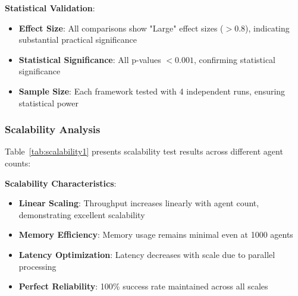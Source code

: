 \documentclass[conference]{IEEEtran}
\begin{document}
\textbf{Statistical Validation}:
\begin{itemize}
\item \textbf{Effect Size}: All comparisons show "Large" effect sizes ($>0.8$), indicating substantial practical significance
\item \textbf{Statistical Significance}: All p-values $<0.001$, confirming statistical significance
\item \textbf{Sample Size}: Each framework tested with 4 independent runs, ensuring statistical power
\end{itemize}

\subsubsection{Scalability Analysis}

Table~\ref{tab:scalability1} presents scalability test results across different agent counts:

\begin{table}[htbp]
\caption{Scalability Test Results}
\label{tab:scalability1}
\centering
{}
\end{table}

\textbf{Scalability Characteristics}:
\begin{itemize}
\item \textbf{Linear Scaling}: Throughput increases linearly with agent count, demonstrating excellent scalability
\item \textbf{Memory Efficiency}: Memory usage remains minimal even at 1000 agents
\item \textbf{Latency Optimization}: Latency decreases with scale due to parallel processing
\item \textbf{Perfect Reliability}: 100\% success rate maintained across all scales
\end{itemize}
\end{document}
